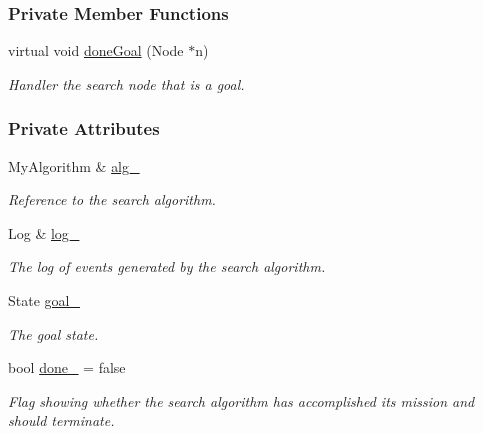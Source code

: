 \subsubsection*{Private Member Functions}
\begin{DoxyCompactItemize}
\item 
virtual void \hyperlink{structgoalHandler_1_1SingleGoal_a5cef56c960f7da98d28d89588b6fe42b}{done\+Goal} (Node $\ast$n)
\begin{DoxyCompactList}\small\item\em Handler the search node that is a goal. \end{DoxyCompactList}\end{DoxyCompactItemize}
\subsubsection*{Private Attributes}
\begin{DoxyCompactItemize}
\item 
My\+Algorithm \& \hyperlink{structgoalHandler_1_1SingleGoal_ad0cd6306e7691aca9780a114e4d95b3f}{alg\+\_\+}\hypertarget{structgoalHandler_1_1SingleGoal_ad0cd6306e7691aca9780a114e4d95b3f}{}\label{structgoalHandler_1_1SingleGoal_ad0cd6306e7691aca9780a114e4d95b3f}

\begin{DoxyCompactList}\small\item\em Reference to the search algorithm. \end{DoxyCompactList}\item 
Log \& \hyperlink{structgoalHandler_1_1SingleGoal_a323deaf473f52f78e2ae17b91e617b6d}{log\+\_\+}\hypertarget{structgoalHandler_1_1SingleGoal_a323deaf473f52f78e2ae17b91e617b6d}{}\label{structgoalHandler_1_1SingleGoal_a323deaf473f52f78e2ae17b91e617b6d}

\begin{DoxyCompactList}\small\item\em The log of events generated by the search algorithm. \end{DoxyCompactList}\item 
State \hyperlink{structgoalHandler_1_1SingleGoal_ab382336e91d8174e30c4dc2f99c46ead}{goal\+\_\+}\hypertarget{structgoalHandler_1_1SingleGoal_ab382336e91d8174e30c4dc2f99c46ead}{}\label{structgoalHandler_1_1SingleGoal_ab382336e91d8174e30c4dc2f99c46ead}

\begin{DoxyCompactList}\small\item\em The goal state. \end{DoxyCompactList}\item 
bool \hyperlink{structgoalHandler_1_1SingleGoal_a568395cf44a53b1cdc68efbeeaf054ba}{done\+\_\+} = false\hypertarget{structgoalHandler_1_1SingleGoal_a568395cf44a53b1cdc68efbeeaf054ba}{}\label{structgoalHandler_1_1SingleGoal_a568395cf44a53b1cdc68efbeeaf054ba}

\begin{DoxyCompactList}\small\item\em Flag showing whether the search algorithm has accomplished its mission and should terminate. \end{DoxyCompactList}\end{DoxyCompactItemize}


